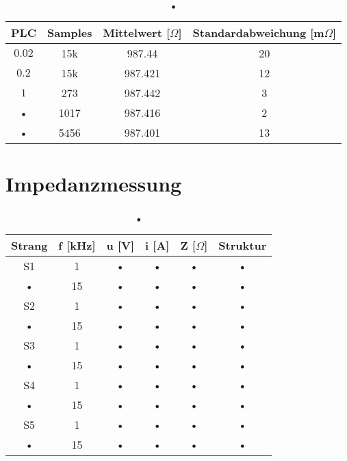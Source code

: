 \begin{table}[]
	\centering
	\begin{tabular}{|c|c|c|c|}
	\hline 
	PLC & Samples & Mittelwert [$\Omega$] & Standardabweichung [m$\Omega$] \\ 
	\hline 
	$0.02$ & 15k & 987.44 & 20 \\ 
	\hline 
	$0.2$ & 15k & 987.421 & 12 \\ 
	\hline 
	$1$ & 273 & 987.442 & 3 \\ 
	\hline 
	• & 1017 & 987.416 & 2 \\ 
	\hline 
	• & 5456 & 987.401 & 13 \\ 
	\hline 
	\end{tabular}
	\caption{•}
\end{table}

\section{Impedanzmessung}
\begin{table}[]
	\centering
	\begin{tabular}{|c|c|c|c|c|c|}
	\hline 
	Strang & f [kHz] & u [V] & i [A] & Z [$\Omega$] & Struktur \\ 
	\hline 
	S1 & 1 & • & • & • & • \\ 
	\hline 
	• & 15 & • & • & • & • \\ 
	\hline 
	S2 & 1 & • & • & • & • \\ 
	\hline 
	• & 15 & • & • & • & • \\ 
	\hline 
	S3 & 1 & • & • & • & • \\ 
	\hline 
	• & 15 & • & • & • & • \\ 
	\hline 
	S4 & 1 & • & • & • & • \\ 
	\hline 
	• & 15 & • & • & • & • \\ 
	\hline 
	S5 & 1 & • & • & • & • \\ 
	\hline 
	• & 15 & • & • & • & • \\ 
	\hline 
	\end{tabular}
	\caption{•}
\end{table}
